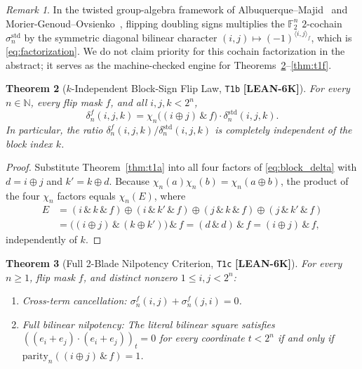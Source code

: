 \documentclass[11pt,reqno]{amsart}
\theoremstyle{plain}
\newtheorem{theorem}{Theorem}[section]
\theoremstyle{definition}
\theoremstyle{remark}
\newtheorem{remark}[theorem]{Remark}
\newcommand{\tagLean}{\mbox{\textsf{\textbf{\color{oiBlue}[LEAN-6K]}}}}
\newcommand{\F}{\mathbb{F}}
\newcommand{\N}{\mathbb{N}}
\newcommand{\std}{\mathrm{std}}
\newcommand{\parbit}{\mathrm{parity}}
\begin{document}
\begin{remark}
In the twisted group-algebra framework of Albuquerque--Majid~\cite{albuquerque1999} and
Morier-Genoud--Ovsienko~\cite{moriergenoud2011}, flipping doubling signs multiplies the
$\F_2^n$ $2$-cochain $\sigma_n^{\std}$ by the symmetric diagonal bilinear character
$(i, j) \mapsto (-1)^{\langle i, j \rangle_f}$, which is \eqref{eq:factorization}. We do not
claim priority for this cochain factorization in the abstract; it serves as the machine-checked
engine for Theorems~\ref{thm:t1b}--\ref{thm:t1f}.
\end{remark}

\begin{theorem}[$k$-Independent Block-Sign Flip Law, \texttt{T1b} \tagLean]
\label{thm:t1b}
For every $n \in \N$, every flip mask $f$, and all $i, j, k < 2^n$,
\begin{equation}
  \delta_n^{f}(i, j, k) = \chi_n\bigl((i \oplus j) \,\&\, f\bigr) \cdot \delta_n^{\std}(i, j, k).
\end{equation}
In particular, the ratio $\delta_n^{f}(i, j, k) / \delta_n^{\std}(i, j, k)$ is completely
independent of the block index $k$.
\end{theorem}

\begin{proof}
Substitute Theorem~\ref{thm:t1a} into all four factors of \eqref{eq:block_delta} with
$d = i \oplus j$ and $k' = k \oplus d$. Because $\chi_n(a)\chi_n(b) = \chi_n(a \oplus b)$,
the product of the four $\chi_n$ factors equals $\chi_n(E)$, where
\begin{align*}
  E &= (i \,\&\, k \,\&\, f) \oplus (i \,\&\, k' \,\&\, f) \oplus
       (j \,\&\, k \,\&\, f) \oplus (j \,\&\, k' \,\&\, f) \\
    &= \bigl((i \oplus j) \,\&\, (k \oplus k')\bigr) \,\&\, f
     = (d \,\&\, d) \,\&\, f = (i \oplus j) \,\&\, f,
\end{align*}
independently of $k$.
\end{proof}

\begin{theorem}[Full 2-Blade Nilpotency Criterion, \texttt{T1c} \tagLean]
\label{thm:t1c}
For every $n \ge 1$, flip mask $f$, and distinct nonzero $1 \le i, j < 2^n$:
\begin{enumerate}[leftmargin=2em]
  \item \emph{Cross-term cancellation:} $\sigma_n^{f}(i, j) + \sigma_n^{f}(j, i) = 0$.
  \item \emph{Full bilinear nilpotency:} The literal bilinear square satisfies
    $((e_i + e_j) \cdot (e_i + e_j))_t = 0$ for every coordinate $t < 2^n$ if and only if
    $\parbit_n((i \oplus j) \,\&\, f) = 1$.
\end{enumerate}
\end{theorem}
\end{document}
